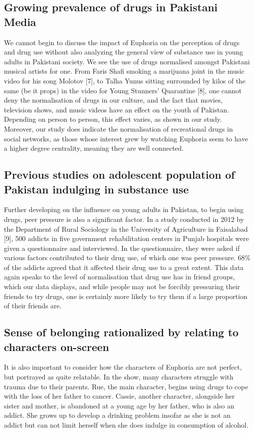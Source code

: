 \documentclass[runningheads]{llncs}
\begin{document}
\subsection{Growing prevalence of drugs in Pakistani Media}
We cannot begin to discuss the impact of Euphoria on the perception of drugs and drug use without also analyzing the general view of substance use in young adults in Pakistani society. We see the use of drugs normalised amongst Pakistani musical artists for one. From Faris Shafi smoking a marijuana joint in the music video for his song Molotov [7], to Talha Yunus sitting surrounded by kilos of the same (be it props) in the video for Young Stunners' Quarantine [8], one cannot deny the normalisation of drugs in our culture, and the fact that movies, television shows, and music videos have an effect on the youth of Pakistan. Depending on person to person, this effect varies, as shown in our study. Moreover, our study does indicate the normalisation of recreational drugs in social networks, as those whose interest grew by watching Euphoria seem to have a higher degree centrality, meaning they are well connected.

\subsection{Previous studies on adolescent population of Pakistan indulging in substance use}
Further developing on the influence on young adults in Pakistan, to begin using drugs, peer pressure is also a significant factor. In a study conducted in 2012 by the Department of Rural Sociology in the University of Agriculture in Faisalabad [9], 500 addicts in five government rehabilitation centers in Punjab hospitals were given a questionnaire and interviewed. In the questionnaire, they were asked if various factors contributed to their drug use, of which one was peer pressure. 68\% of the addicts agreed that it affected their drug use to a great extent. This data again speaks to the level of normalisation that drug use has in friend groups, which our data displays, and while people may not be forcibly pressuring their friends to try drugs, one is certainly more likely to try them if a large proportion of their friends are.

\subsection{Sense of belonging rationalized by relating to characters on-screen}
It is also important to consider how the characters of Euphoria are not perfect, but portrayed as quite relatable. In the show, many characters struggle with trauma due to their parents. Rue, the main character, begins using drugs to cope with the loss of her father to cancer. Cassie, another character, alongside her sister and mother, is abandoned at a young age by her father, who is also an addict. She grows up to develop a drinking problem insofar as she is not an addict but can not limit herself when she does indulge in consumption of alcohol. 
\end{document}
